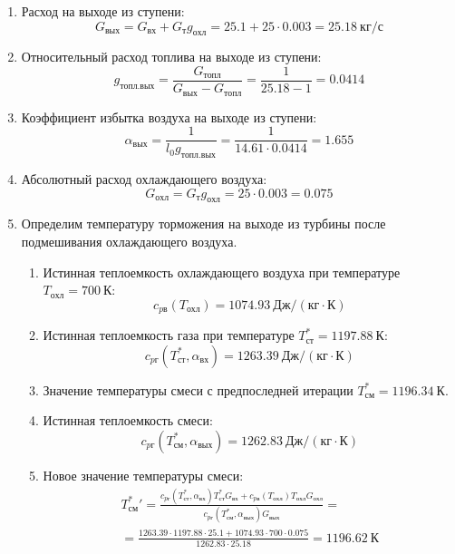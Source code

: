 \documentclass[a4paper,10pt]{article}
\begin{document}
\begin{enumerate}
        \item Расход на выходе из ступени:
        \[
            G_{вых} = G_{вх} + G_т g_{охл} =
                25.1 + 25 \cdot
                0.003 =
            25.18 \ кг/с
        \]

        \item Относительный расход топлива на выходе из ступени:
        \[
            g_{топл.вых} = \frac{ G_{топл} }{ G_{вых} - G_{топл} } =
                 \frac{ 1 }{ 25.18 - 1 } =
            0.0414
        \]

        \item Коэффициент избытка воздуха на выходе из ступени:
        \[
            \alpha_{вых} = \frac{ 1 }{ l_0 g_{топл.вых} } =
                \frac{ 1 }{ 14.61 \cdot 0.0414 } =
            1.655
        \]

        \item Абсолютный расход охлаждающего воздуха:
        \[
            G_{охл} = G_т g_{охл} = 25 \cdot 0.003 =
            0.075
        \]

        \item Определим температуру торможения на выходе из турбины после подмешивания охлаждающего воздуха.
        \begin{enumerate}

            \item Истинная теплоемкость охлаждающего воздуха при температуре $T_{охл} = 700\ К $:
            \[
                c_{pв} (T_{охл}) = 1074.93\ Дж/ (кг \cdot К)
            \]

            \item Истинная теплоемкость газа при температуре $T_{ст}^* = 1197.88 \ К $:
            \[
                c_{pг} (T_{ст}^*, \alpha_{вх}) =
                1263.39\ Дж/ (кг \cdot К)
            \]

            \item Значение температуры смеси с предпоследней итерации $T_{см}^{*} = 1196.34\ К$.

            \item Истинная теплоемкость смеси:
            \[
                c_{pг} (T_{см}^{*}, \alpha_{вых}) =
                1262.83\ Дж/ (кг \cdot К)
            \]

            \item Новое значение температуры смеси:
            \begin{gather*}
                T_{см}^*\prime = \frac{
                        c_{pг} (T_{ст}^*, \alpha_{вх}) T_{ст}^* G_{вх} + c_{pв} (T_{охл}) T_{охл} G_{охл}
                    }{
                        c_{pг} (T_{см}^{*}, \alpha_{вых}) G_{вых}
                    } =\\
                = \frac{
                    1263.39
                    \cdot 1197.88 \cdot 25.1 +
                    1074.93
                    \cdot 700 \cdot 0.075
                }{
                    1262.83
                    \cdot  25.18
                } =
                1196.62\ К\\
            \end{gather*}


\end{enumerate}
\end{enumerate}
\end{document}
